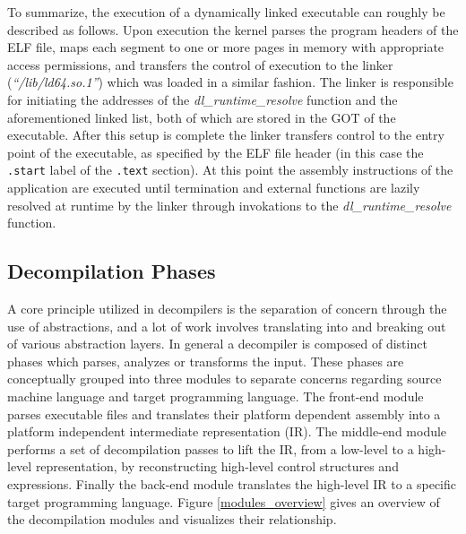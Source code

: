 \documentclass[12pt, a4paper]{article}
\begin{document}
To summarize, the execution of a dynamically linked executable can roughly be described as follows. Upon execution the kernel parses the program headers of the ELF file, maps each segment to one or more pages in memory with appropriate access permissions, and transfers the control of execution to the linker (\textit{``/lib/ld64.so.1''}) which was loaded in a similar fashion. The linker is responsible for initiating the addresses of the \textit{dl\_runtime\_resolve} function and the aforementioned linked list, both of which are stored in the GOT of the executable. After this setup is complete the linker transfers control to the entry point of the executable, as specified by the ELF file header (in this case the \texttt{.start} label of the \texttt{.text} section). At this point the assembly instructions of the application are executed until termination and external functions are lazily resolved at runtime by the linker through invokations to the \textit{dl\_runtime\_resolve} function.


\subsection{Decompilation Phases}

A core principle utilized in decompilers is the separation of concern through the use of abstractions, and a lot of work involves translating into and breaking out of various abstraction layers. In general a decompiler is composed of distinct phases which parses, analyzes or transforms the input. These phases are conceptually grouped into three modules to separate concerns regarding source machine language and target programming language. The front-end module parses executable files and translates their platform dependent assembly into a platform independent intermediate representation (IR). The middle-end module performs a set of decompilation passes to lift the IR, from a low-level to a high-level representation, by reconstructing high-level control structures and expressions. Finally the back-end module translates the high-level IR to a specific target programming language. Figure \ref{modules_overview} gives an overview of the decompilation modules and visualizes their relationship.
\end{document}
